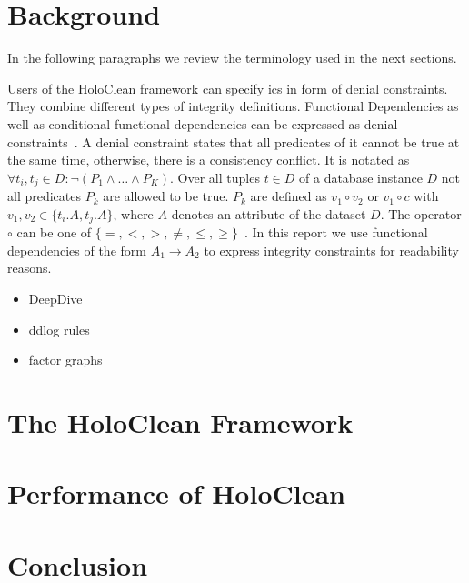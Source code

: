 \section{Background}\label{sec:background}
  In the following paragraphs we review the terminology used in the next sections.
  
  Users of the HoloClean framework can specify \glspl{ic} in form of denial constraints.
  They combine different types of integrity definitions.
  Functional Dependencies as well as conditional functional dependencies can be expressed as denial constraints~\cite{fd_to_dc}.
  A denial constraint states that all predicates of it cannot be true at the same time, otherwise, there is a consistency conflict.
  It is notated as $\forall t_i, t_j \in D: \neg(P_1 \wedge \dots \wedge P_K)$.
  Over all tuples $t \in D$ of a database instance $D$ not all predicates $P_k$ are allowed to be true.
  $P_k$ are defined as $v_1 \circ v_2$ or $v_1 \circ c$ with $v_1, v_2 \in \{t_i.A, t_j.A\}$, where $A$ denotes an attribute of the dataset $D$.
  The operator $\circ$ can be one of $\{=,<,>,\neq,\leq,\geq\}$~\cite{chu2013discoveringdc}.
  In this report we use functional dependencies of the form $A_1 \rightarrow A_2$ to express integrity constraints for readability reasons.
  
  \begin{itemize}
    \item DeepDive
    \item ddlog rules
    \item factor graphs
  \end{itemize}
  

\section{The HoloClean Framework}\label{sec:framework}

\section{Performance of HoloClean}\label{sec:performance}

\section{Conclusion}\label{sec:conclusion}